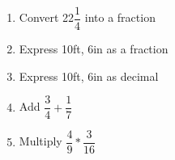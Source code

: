 \begin{enumerate}[1.]

\item Convert 22$\dfrac{1}{4}$ into a fraction
\item Express 10ft, 6in as a fraction
\item Express 10ft, 6in as decimal
\item Add $\dfrac{3}{4}+\dfrac{1}{7}$
\item Multiply $\dfrac{4}{9}*\dfrac{3}{16}$


\end{enumerate}
